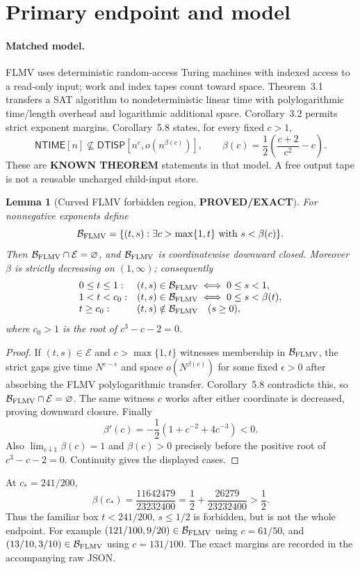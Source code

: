 \documentclass[11pt]{article}
\newtheorem{lemma}{Lemma}
\newcommand{\DTISP}{\mathsf{DTISP}}
\newcommand{\NTIME}{\mathsf{NTIME}}
\newcommand{\EE}{\mathcal E}
\newcommand{\BB}{\mathcal B_{\rm FLMV}}
\newcommand{\EXACT}{\textbf{PROVED/EXACT}}
\newcommand{\KNOWN}{\textbf{KNOWN THEOREM}}
\begin{document}
\section{Primary endpoint and model}

\paragraph{Matched model.}
FLMV uses deterministic random-access Turing machines with indexed access to
a read-only input; work and index tapes count toward space.  Theorem~3.1
transfers a SAT algorithm to nondeterministic linear time with polylogarithmic
time/length overhead and logarithmic additional space.  Corollary~3.2 permits
strict exponent margins.  Corollary~5.8 states, for every fixed $c>1$,
\[
  \NTIME[n]\not\subseteq
  \DTISP\!\left[n^c,o\!\left(n^{\beta(c)}\right)\right],
  \qquad
  \beta(c)=\frac12\left(\frac{c+2}{c^2}-c\right).
\]
These are \KNOWN{} statements in that model.  A free output tape is not a
reusable uncharged child-input store.

\begin{lemma}[Curved FLMV forbidden region, \EXACT]
For nonnegative exponents define
\[
 \BB=\{(t,s):\exists c>\max\{1,t\}\text{ with }s<\beta(c)\}.
\]
Then $\BB\cap\EE=\varnothing$, and $\BB$ is coordinatewise downward closed.
Moreover $\beta$ is strictly decreasing on $(1,\infty)$; consequently
\[
\begin{array}{ll}
0\le t\le1:&(t,s)\in\BB\iff 0\le s<1,\\
1<t<c_0:&(t,s)\in\BB\iff 0\le s<\beta(t),\\
t\ge c_0:&(t,s)\notin\BB\quad(s\ge0),
\end{array}
\]
where $c_0>1$ is the root of $c^3-c-2=0$.
\end{lemma}
\begin{proof}
If $(t,s)\in\EE$ and $c>\max\{1,t\}$ witnesses membership in $\BB$, the
strict gaps give time $N^{c-\epsilon}$ and space
$o(N^{\beta(c)})$ for some fixed $\epsilon>0$ after absorbing the FLMV
polylogarithmic transfer.  Corollary~5.8 contradicts this, so
$\BB\cap\EE=\varnothing$.  The same witness $c$ works after either coordinate
is decreased, proving downward closure.  Finally
\[
 \beta'(c)=-\frac12\left(1+c^{-2}+4c^{-3}\right)<0.
\]
Also $\lim_{c\downarrow1}\beta(c)=1$ and $\beta(c)>0$ precisely before the
positive root of $c^3-c-2=0$.  Continuity gives the displayed cases.
\end{proof}

At $c_*=241/200$,
\[
 \beta(c_*)=\frac{11642479}{23232400}
 =\frac12+\frac{26279}{23232400}>\frac12.
\]
Thus the familiar box $t<241/200$, $s\le1/2$ is forbidden, but is not the
whole endpoint.  For example $(121/100,9/20)\in\BB$ using $c=61/50$, and
$(13/10,3/10)\in\BB$ using $c=131/100$.  The exact margins are recorded in
the accompanying raw JSON.
\end{document}
